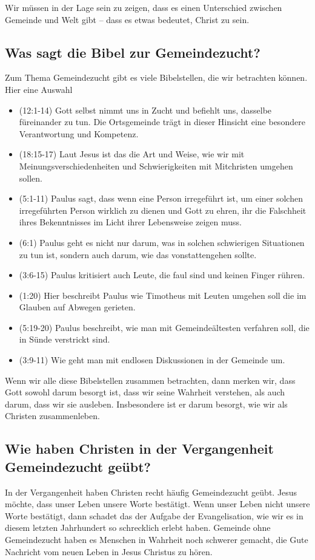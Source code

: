 \documentclass{../../inc/mybib}
\begin{document}
Wir müssen in der Lage sein zu zeigen, dass es einen Unterschied zwischen Gemeinde und Welt gibt -- dass es etwas bedeutet, Christ zu sein.

\subsection{Was sagt die Bibel zur Gemeindezucht? }
Zum Thema Gemeindezucht gibt es viele Bibelstellen, die wir betrachten können. Hier eine Auswahl
\begin{itemize}
    \item {}(12:1-14) Gott selbst nimmt uns in Zucht und befiehlt uns, dasselbe füreinander zu tun. Die Ortsgemeinde trägt in dieser Hinsicht eine besondere Verantwortung und Kompetenz.
    \item {}(18:15-17) Laut Jesus ist das die Art und Weise, wie wir mit Meinungsverschiedenheiten und Schwierigkeiten mit Mitchristen umgehen sollen.
    \item {}(5:1-11) Paulus sagt, dass wenn eine Person irregeführt ist, um einer solchen irregeführten Person wirklich zu dienen und Gott zu ehren, ihr die Falschheit ihres Bekenntnisses im Licht ihrer Lebensweise zeigen muss.
    \item {}(6:1) Paulus geht es nicht nur darum, was in solchen schwierigen Situationen zu tun ist, sondern auch darum, wie das vonstattengehen sollte.
    \item {}(3:6-15) Paulus kritisiert auch Leute, die faul sind und keinen Finger rühren.
    \item {}(1:20) Hier beschreibt Paulus wie Timotheus mit Leuten umgehen soll die im Glauben auf Abwegen gerieten.
    \item {}(5:19-20) Paulus beschreibt, wie man mit Gemeindeältesten verfahren soll, die in Sünde verstrickt sind.
    \item {}(3:9-11) Wie geht man mit endlosen Diskussionen in der Gemeinde um.
\end{itemize}
Wenn wir alle diese Bibelstellen zusammen betrachten, dann merken wir, dass Gott sowohl darum besorgt ist, dass wir seine Wahrheit verstehen, als auch darum, dass wir sie ausleben. Insbesondere ist er darum besorgt, wie wir als Christen zusammenleben.
\subsection{Wie haben Christen in der Vergangenheit Gemeindezucht geübt? }
In der Vergangenheit haben Christen recht häufig Gemeindezucht geübt. Jesus möchte, dass unser Leben unsere Worte bestätigt. Wenn unser Leben nicht unsere Worte bestätigt, dann schadet das der Aufgabe der Evangelisation, wie wir es in diesem letzten Jahrhundert so schrecklich erlebt haben. Gemeinde ohne Gemeindezucht haben es Menschen in Wahrheit noch schwerer gemacht, die Gute Nachricht vom neuen Leben in Jesus Christus zu hören.
\end{document}

